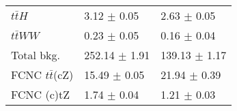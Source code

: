 \documentclass[10pt]{article}
\begin{document}
\begin{table}[]
\begin{tabular}{|l|l|l|}
		$t\bar{t}H$             			&  3.12 $\pm$ 0.05  	   &   2.63 $\pm$ 0.05                           \\   
		$t\bar{t}WW$          				&  0.23 $\pm$ 0.05  	   &   0.16 $\pm$ 0.04                           \\   
		\hline                                                                                                        
		Total bkg.              			&  252.14 $\pm$ 1.91 	   & 139.13 $\pm$ 1.17                          \\       
		\hline                                                                
		FCNC $t\bar{t}$(cZ)   				&   15.49 $\pm$ 0.05	   &  21.94 $\pm$ 0.39                \\
		FCNC (c)tZ              			&    1.74 $\pm$ 0.04	   &  1.21 $\pm$ 0.03                          \\
		\hline
		\end{tabular}
	\end{table}   
\end{document}
